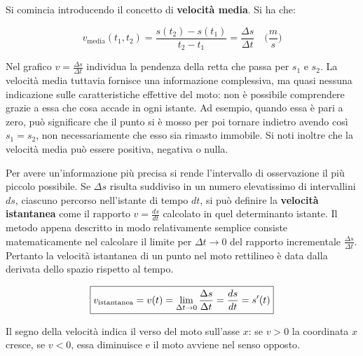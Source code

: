 Si comincia introducendo il concetto di \textbf{velocità media}. Si ha che:

\begin{equation}
	\boxed{v_\text{media} (t_1,t_2)= \frac{s(t_2)-s(t_1)}{t_2 - t_1}= \frac{\Delta s}{\Delta t} \quad \biggl(\frac{m}{s}\biggr)}
\end{equation}

Nel grafico $v=\frac{\Delta s}{\Delta t}$ individua la pendenza della retta che passa per $s_1$ e $s_2$. La velocità media tuttavia fornisce una informazione complessiva, ma quasi nessuna indicazione sulle caratteristiche effettive del moto: non è possibile comprendere grazie a essa che cosa accade in ogni istante. Ad esempio, quando essa è pari a zero, può significare che il punto si è mosso per poi tornare indietro avendo così $s_1=s_2$, non necessariamente che esso sia rimasto immobile. Si noti inoltre che la velocità media può essere positiva, negativa o nulla.

Per avere un'informazione più precisa si rende l'intervallo di osservazione il più piccolo possibile. Se $\Delta s$ risulta suddiviso in un numero elevatissimo di intervallini $ds$, ciascuno percorso nell'istante di tempo $dt$, si può definire la \textbf{velocità istantanea} come il rapporto $v=\frac{ds}{dt}$ calcolato in quel determinanto istante. Il metodo appena descritto in modo relativamente semplice consiste matematicamente nel calcolare il limite per $\Delta t \to 0$ del rapporto incrementale $\frac{\Delta s}{\Delta t}$.
Pertanto la velocità istantanea di un punto nel moto rettilineo è data dalla derivata dello spazio rispetto al tempo.

\begin{equation}
	\boxed{v_\textup{istantanea}=v(t)=\lim_{\Delta t \to 0} \frac{\Delta s} {\Delta t}= \frac{ds}{dt}=s'(t)}
\end{equation}

Il segno della velocità indica il verso del moto sull'asse $x$: se $v>0$ la coordinata $x$ cresce, se $v<0$, essa diminuisce e il moto avviene nel senso opposto.

